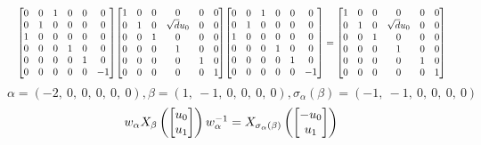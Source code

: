 \documentclass[11pt]{article}
\theoremstyle{definition}
\begin{document}
\[
\scaletoalign{\textwidth}{{\left[\begin{matrix}0 & 0 & 1 & 0 & 0 & 0\\0 & 1 & 0 & 0 & 0 & 0\\1 & 0 & 0 & 0 & 0 & 0\\0 & 0 & 0 & 1 & 0 & 0\\0 & 0 & 0 & 0 & 1 & 0\\0 & 0 & 0 & 0 & 0 & -1\end{matrix}\right]} {\left[\begin{matrix}1 & 0 & 0 & 0 & 0 & 0\\0 & 1 & 0 & \sqrt{d} u_{0} & 0 & 0\\0 & 0 & 1 & 0 & 0 & 0\\0 & 0 & 0 & 1 & 0 & 0\\0 & 0 & 0 & 0 & 1 & 0\\0 & 0 & 0 & 0 & 0 & 1\end{matrix}\right]} {\left[\begin{matrix}0 & 0 & 1 & 0 & 0 & 0\\0 & 1 & 0 & 0 & 0 & 0\\1 & 0 & 0 & 0 & 0 & 0\\0 & 0 & 0 & 1 & 0 & 0\\0 & 0 & 0 & 0 & 1 & 0\\0 & 0 & 0 & 0 & 0 & -1\end{matrix}\right]} = {\left[\begin{matrix}1 & 0 & 0 & 0 & 0 & 0\\0 & 1 & 0 & \sqrt{d} u_{0} & 0 & 0\\0 & 0 & 1 & 0 & 0 & 0\\0 & 0 & 0 & 1 & 0 & 0\\0 & 0 & 0 & 0 & 1 & 0\\0 & 0 & 0 & 0 & 0 & 1\end{matrix}\right]}}
\]
\[
\alpha = \left( -2, \  0, \  0, \  0, \  0, \  0\right), \beta = \left( 1, \  -1, \  0, \  0, \  0, \  0\right), \sigma_{\alpha}(\beta) = \left( -1, \  -1, \  0, \  0, \  0, \  0\right)
\]
\[
\scaletoalign{\textwidth}{w_{\alpha} X_{\beta}\left(\left[\begin{matrix}u_{0}\\u_{1}\end{matrix}\right]\right) w_{\alpha}^{-1} = X_{\sigma_{\alpha}\left(\beta\right)}\left(\left[\begin{matrix}- u_{0}\\u_{1}\end{matrix}\right]\right)}
\]
\end{document}
